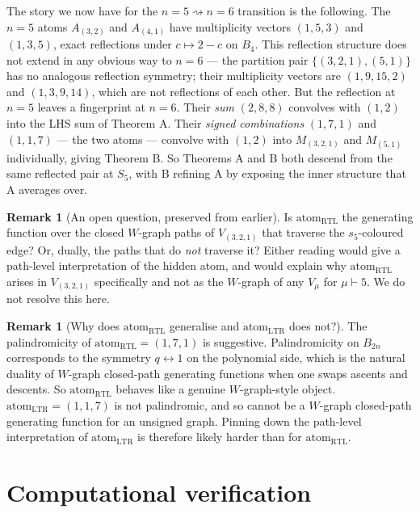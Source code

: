 \documentclass[11pt]{article}
\theoremstyle{definition}
\newtheorem{remark}[theorem]{Remark}
\begin{document}
The story we now have for the $n=5 \rightsquigarrow n=6$ transition is the following. The $n=5$ atoms $A_{(3,2)}$ and $A_{(4,1)}$ have multiplicity vectors $(1,5,3)$ and $(1,3,5)$, exact reflections under $c \mapsto 2-c$ on $B_4$. This reflection structure does not extend in any obvious way to $n=6$ — the partition pair $\{(3,2,1), (5,1)\}$ has no analogous reflection symmetry; their multiplicity vectors are $(1,9,15,2)$ and $(1,3,9,14)$, which are not reflections of each other. But the reflection at $n=5$ leaves a fingerprint at $n=6$. Their \emph{sum} $(2,8,8)$ convolves with $(1,2)$ into the LHS sum of Theorem A. Their \emph{signed combinations} $(1,7,1)$ and $(1,1,7)$ — the two atoms — convolve with $(1,2)$ into $M_{(3,2,1)}$ and $M_{(5,1)}$ individually, giving Theorem B. So Theorems A and B both descend from the same reflected pair at $S_5$, with B refining A by exposing the inner structure that A averages over.

\begin{remark}[An open question, preserved from earlier]
Is $\mathrm{atom}_{\mathrm{RTL}}$ the generating function over the closed $W$-graph paths of $V_{(3,2,1)}$ that traverse the $s_5$-coloured edge? Or, dually, the paths that do \emph{not} traverse it? Either reading would give a path-level interpretation of the hidden atom, and would explain why $\mathrm{atom}_{\mathrm{RTL}}$ arises in $V_{(3,2,1)}$ specifically and not as the $W$-graph of any $V_\mu$ for $\mu \vdash 5$. We do not resolve this here.
\end{remark}

\begin{remark}[Why does $\mathrm{atom}_{\mathrm{RTL}}$ generalise and $\mathrm{atom}_{\mathrm{LTR}}$ does not?]
The palindromicity of $\mathrm{atom}_{\mathrm{RTL}} = (1,7,1)$ is suggestive. Palindromicity on $B_{2n}$ corresponds to the symmetry $q \leftrightarrow 1$ on the polynomial side, which is the natural duality of $W$-graph closed-path generating functions when one swaps ascents and descents. So $\mathrm{atom}_{\mathrm{RTL}}$ behaves like a genuine $W$-graph-style object. $\mathrm{atom}_{\mathrm{LTR}} = (1,1,7)$ is not palindromic, and so cannot be a $W$-graph closed-path generating function for an unsigned graph. Pinning down the path-level interpretation of $\mathrm{atom}_{\mathrm{LTR}}$ is therefore likely harder than for $\mathrm{atom}_{\mathrm{RTL}}$.
\end{remark}

\section*{Computational verification}
\end{document}
